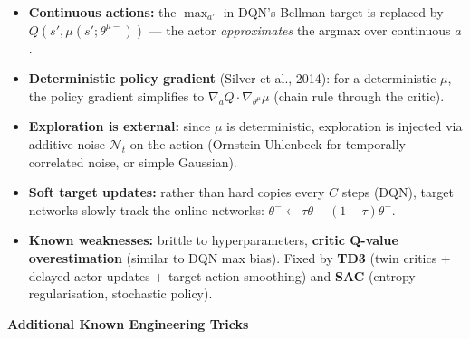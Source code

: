 \documentclass[11pt]{article}
\providecommand{\tightlist}{%
      \setlength{\itemsep}{0pt}\setlength{\parskip}{0pt}}
\begin{document}
\begin{itemize}
\tightlist
\item
  \textbf{Continuous actions:} the \(\max_{a'}\) in DQN's Bellman target
  is replaced by \(Q(s', \mu(s';\theta^{\mu-}))\) --- the actor
  \emph{approximates} the argmax over continuous \(a\).
\item
  \textbf{Deterministic policy gradient} (Silver et al., 2014): for a
  deterministic \(\mu\), the policy gradient simplifies to
  \(\nabla_a Q \cdot \nabla_{\theta^\mu} \mu\) (chain rule through the
  critic).
\item
  \textbf{Exploration is external:} since \(\mu\) is deterministic,
  exploration is injected via additive noise \(\mathcal{N}_t\) on the
  action (Ornstein-Uhlenbeck for temporally correlated noise, or simple
  Gaussian).
\item
  \textbf{Soft target updates:} rather than hard copies every \(C\)
  steps (DQN), target networks slowly track the online networks:
  \(\theta^- \leftarrow \tau\theta + (1-\tau)\theta^-\).
\item
  \textbf{Known weaknesses:} brittle to hyperparameters, \textbf{critic
  Q-value overestimation} (similar to DQN max bias). Fixed by
  \textbf{TD3} (twin critics + delayed actor updates + target action
  smoothing) and \textbf{SAC} (entropy regularisation, stochastic
  policy).
\end{itemize}

    \label{tricks-4-5}

    \textbf{Additional Known Engineering Tricks}
\end{document}
